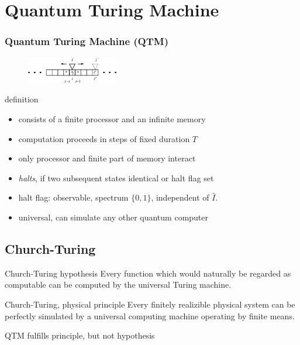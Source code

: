 \documentclass{beamer}
\begin{document}
\section{Quantum Turing Machine}
%
\begin{frame}
	\frametitle{Quantum Turing Machine (QTM)}
	\begin{figure}
		\includegraphics[width=4cm]{qtm.png}
	\end{figure}
	\begin{block}{definition}
	    \begin{itemize}
			\item consists of a finite processor and an infinite memory
			\item computation proceeds in steps of fixed duration $T$
			\item only processor and finite part of memory interact
			\item \emph{halts}, if two subsequent states identical or halt flag set
			\item halt flag: observable, spectrum $\{0,1\}$, independent of $\hat{I}$.
			\item universal, can simulate any other quantum computer
		\end{itemize}
	\end{block}
\end{frame}
%
\subsection{Church-Turing}
\begin{frame}
    \begin{block}{Church-Turing hypothesis}
        Every function which would naturally be regarded as computable can be computed by the universal Turing machine.
    \end{block}
    \begin{block}{Church-Turing, physical principle}
        Every finitely realizible physical system can be perfectly simulated by a universal computing machine operating by finite means.
    \end{block}
    QTM fulfills principle, but not hypothesis
\end{frame}
%
\end{document}
